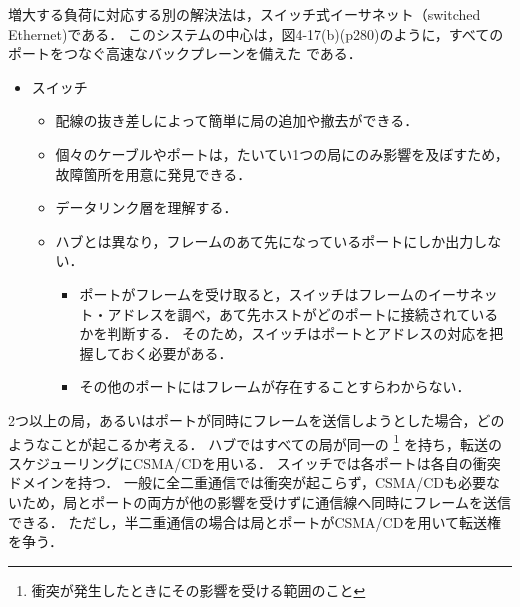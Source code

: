 \documentclass[a4paper]{ltjsarticle}
\begin{document}
増大する負荷に対応する別の解決法は，スイッチ式イーサネット（switched
Ethernet)である．
このシステムの中心は，図4-17(b)(p280)のように，すべてのポートをつなぐ高速なバックプレーンを備えた
 である．

\begin{itemize}
\item
  スイッチ

  \begin{itemize}

  \item
    配線の抜き差しによって簡単に局の追加や撤去ができる．
  \item
    個々のケーブルやポートは，たいてい1つの局にのみ影響を及ぼすため，故障箇所を用意に発見できる．
  \item
    データリンク層を理解する．
  \item
    ハブとは異なり，フレームのあて先になっているポートにしか出力しない．

    \begin{itemize}
  
    \item
      ポートがフレームを受け取ると，スイッチはフレームのイーサネット・アドレスを調べ，あて先ホストがどのポートに接続されているかを判断する．
      そのため，スイッチはポートとアドレスの対応を把握しておく必要がある．
    \item
      その他のポートにはフレームが存在することすらわからない．
    \end{itemize}
  \end{itemize}
\end{itemize}

2つ以上の局，あるいはポートが同時にフレームを送信しようとした場合，どのようなことが起こるか考える．
ハブではすべての局が同一の 
\footnote{衝突が発生したときにその影響を受ける範囲のこと}
を持ち，転送のスケジューリングにCSMA/CDを用いる．
スイッチでは各ポートは各自の衝突ドメインを持つ．
一般に全二重通信では衝突が起こらず，CSMA/CDも必要ないため，局とポートの両方が他の影響を受けずに通信線へ同時にフレームを送信できる．
ただし，半二重通信の場合は局とポートがCSMA/CDを用いて転送権を争う．
\end{document}
